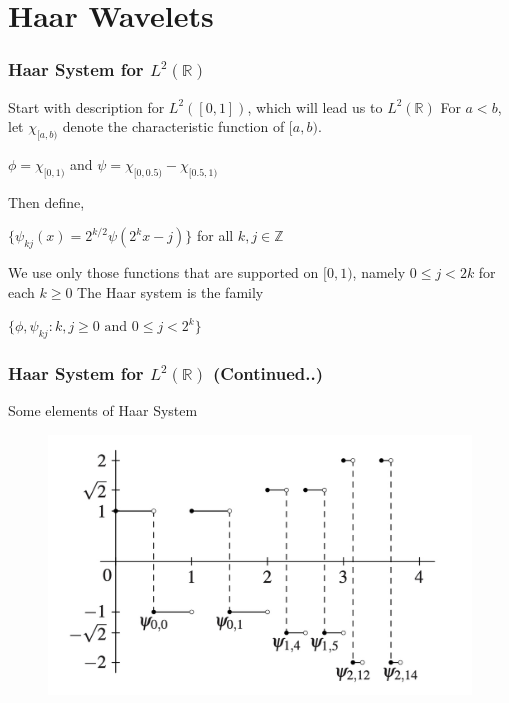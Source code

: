 \documentclass{beamer}
\begin{document}

\section{Haar Wavelets} %

\begin{frame}
\frametitle{Haar System for  $L^2\left({\mathbb{R}}\right)$ }
Start with description for $L^2([0,1])$, which will lead us to $L^2\left({\mathbb{R}}\right)$
\linebreak\linebreak
For $a < b$, let $\chi_{[a,b)}$ denote the characteristic function of $[a, b)$.

\begin{center}
        $\phi=\chi_{[0,1)}$ and $\psi = \chi_{[0, 0.5)} - \chi_{[0.5, 1)}$
    \end{center} 
Then define,
\begin{center}
    $\{\psi_{kj}(x) = 2^{k/2}\psi(2^kx-j)\}$ \space\space\space for all \space\space\space $k,j \in \mathbb{Z}$
\end{center} 

We use only those functions that are supported on $[0, 1)$, namely $0 \le j < 2k$ for each
$k \ge 0$
\linebreak\linebreak
The Haar system is the family

\begin{block}{}
    \begin{center}
        $\{\phi, \psi_{kj}:k,j\ge 0 \text{ and } 0 \le j < 2^k\}$
    \end{center}
\end{block}

\end{frame}

\begin{frame}
\frametitle{ Haar System for  $L^2\left({\mathbb{R}}\right)$ (Continued..)}
Some elements of Haar System
\begin{figure}
\includegraphics[width=0.8\linewidth]{haarsystem.jpg}
\end{figure}
\end{frame}
\end{document}
